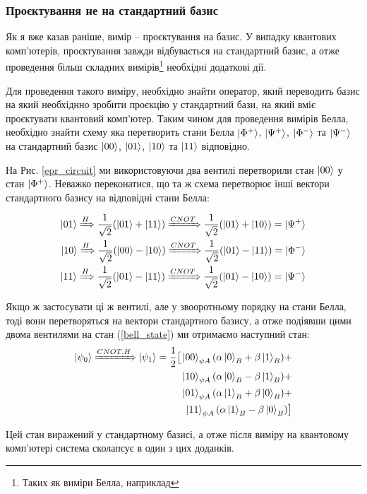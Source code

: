 \documentclass{article}
\begin{document}
\subsubsection{Проєктування не на стандартний базис}

Як я вже казав раніше, вимір -- проєктування на базис. У випадку квантових комп'ютерів, проєктування завжди відбувається на стандартний базис, а отже проведення більш складних вимірів\footnote{Таких як виміри Белла, наприклад} необхідні додаткові дії.

Для проведення такого виміру, необхідно знайти оператор, який переводить базис на який необхіднно зробити проєкцію у стандартний бази, на який вміє проєктувати квантовий комп'ютер.
Таким чином для проведення вимірів Белла, необхідно знайти схему яка перетворить стани Белла $\ket{\Phi^+}$, $\ket{\Psi^+}$, $\ket{\Phi^-}$ та $\ket{\Psi^-}$ на стандартний базис $\ket{00}$, $\ket{01}$, $\ket{10}$ та $\ket{11}$ відповідно.

На Рис. \ref{epr_circuit} ми використовуючи два вентилі перетворили стан $\ket{00}$ у стан $\ket{\Phi^+}$. Неважко переконатися, що та ж схема перетворює інші вектори стандартного базису на відповідні стани Белла:

\begin{align*}
\ket{01} \xRightarrow{H} \frac{1}{\sqrt{2}} (\ket{01}+\ket{11}) \xRightarrow{CNOT} \frac{1}{\sqrt{2}} (\ket{01}+\ket{10}) = \ket{\Psi^+} \\
\ket{10} \xRightarrow{H} \frac{1}{\sqrt{2}} (\ket{00}-\ket{10}) \xRightarrow{CNOT} \frac{1}{\sqrt{2}} (\ket{01}-\ket{11}) = \ket{\Phi^-} \\
\ket{11} \xRightarrow{H} \frac{1}{\sqrt{2}} (\ket{01}-\ket{11}) \xRightarrow{CNOT} \frac{1}{\sqrt{2}} (\ket{01}-\ket{10}) = \ket{\Psi^-}
\end{align*}

Якщо ж застосувати ці ж вентилі, але у звооротньому порядку на стани Белла, тоді вони перетворяться на вектори стандартного базису, а отже подіявши цими двома вентилями на стан (\ref{bell_state}) ми отримаємо наступний стан:
\begin{align*}
    \ket{\psi_0} \xRightarrow{CNOT, H} \ket{\psi_1} = \frac{1}{2}\big[
    \ket{00}_{\psi A}(\alpha\ket{0}_B + \beta\ket{1}_B) + \\
    \ket{10}_{\psi A}(\alpha\ket{0}_B - \beta\ket{1}_B) + \\
    \ket{01}_{\psi A}(\alpha\ket{1}_B + \beta\ket{0}_B) + \\
    \ket{11}_{\psi A}(\alpha\ket{1}_B - \beta\ket{0}_B)
    \big]
\end{align*}

Цей стан виражений у стандартному базисі, а отже після виміру на квантовому комп'ютері система сколапсує в один з цих доданків.
\end{document}
